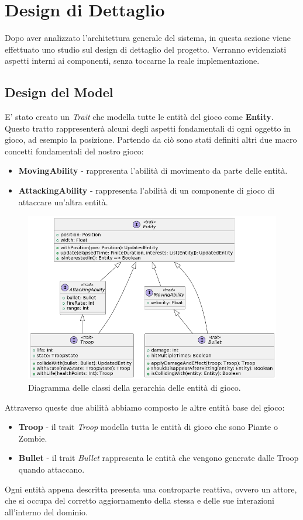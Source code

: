 \section{Design di Dettaglio}
Dopo aver analizzato l'architettura generale del sistema, in questa sezione viene effettuato uno studio sul design
di dettaglio del progetto.
Verranno evidenziati aspetti interni ai componenti, senza toccarne la reale implementazione.

\subsection{Design del Model}
E' stato creato un \textit{Trait} che modella tutte le entità del gioco come \textbf{Entity}. Questo tratto rappresenterà
alcuni degli aspetti fondamentali di ogni oggetto in gioco, ad esempio la posizione. Partendo da ciò sono stati definiti
altri due macro concetti fondamentali del nostro gioco:
\begin{itemize}
    \item \textbf{MovingAbility} - rappresenta l'abilità di movimento da parte delle entità.
    \item \textbf{AttackingAbility} - rappresenta l'abilità di un componente di gioco di attaccare un'altra entità.
\end{itemize}
\begin{figure}[H]
    \centering
    \includegraphics[width=\linewidth]{images/model-desing}
    \caption{Diagramma delle classi della gerarchia delle entità di gioco.}
\end{figure}
Attraverso queste due abilità abbiamo composto le altre entità base del gioco:
\begin{itemize}
    \item \textbf{Troop} - il trait \textit{Troop} modella tutta le entità di gioco che sono Piante o Zombie.
    \item \textbf{Bullet} - il trait \textit{Bullet} rappresenta le entità che vengono generate dalle Troop quando
    attaccano.
\end{itemize}
Ogni entità appena descritta presenta una controparte
reattiva, ovvero un attore, che si occupa del corretto aggiornamento della stessa e delle sue
interazioni all’interno del dominio.\\

